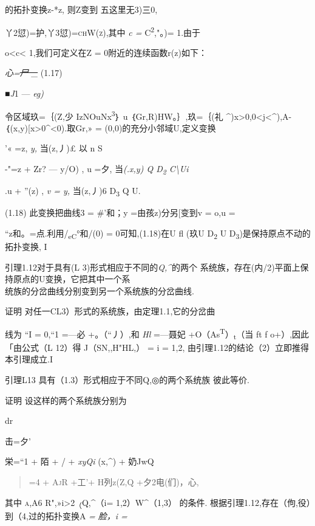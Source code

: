 \documentclass{article}
\begin{document}
的拓扑变换z-*z, 则Z变到 五这里无3)三0,

丫2愆)=护,丫3愆)\textsc{=chW(z),}其中 \emph{c =}
C\textsuperscript{2},"。)= 1.由于

o\textless{}c\textless{} 1,我们可定义在Z = 0附近的连续函数r(z)如下：

\emph{心=\sout{{尸 \_}}} (1.17)

\emph{■J}1 --- \emph{eg)}

令区域玖=｛(Z,少 IzNOuNx\textsuperscript{3}｝ u ｛Gr,R)HW。｝,玖=｛(礼
\^{})\textbar{}x\textgreater{}0,0\textless{}j\textless{}\^{}),A-
｛(x,y){[}x\textgreater{}0\^{}\textless{}0).取Gr,» =
(0,0)的充分小邻域U,定义变换

'« =z, \emph{y,} 当(z,丿)£ 以 n S

-"=z + Zr? --- y/O) , u =夕, 当\emph{(.x,y) Q D\textsubscript{2}
C\textbackslash{}Ui}

.u + ''(z) , \emph{v = y,} 当(z,丿)6 D\textsubscript{3} Q U.

(1.18) 此变换把曲线3 = \#'和；y =由孩z)分另{[}\textbar{}变到v = o,u =

``z和。=点.利用/\textsubscript{eC}°和/(0) = 0可知,(1.18)在U fl (玖U
D\textsubscript{2} U D\textsubscript{3})是保持原点不动的拓扑变换, I

引理1.12对于具有(L 3)形式相应于不同的\emph{Q,\^{}}的两个
系统族，存在(内/2)平面上保持原点的U变换，它把其中一个系\\
统族的分岔曲线分别变到另一个系统族的分岔曲线.

证明 对任一CL3）形式的系统族，由定理1.1,它的分岔曲

线为 ``I = 0,``1 =---必 +。（``丿）,和 \emph{Hl} =---聂妃
+O（As\textsuperscript{T}）\textsubscript{t}（当 ft f
o+）,因此「由公式（L 12）得 J（SN,,H"HL,） = i = 1,2,
由引理1.12的结论（2）立即推得本引理成立.I

引理L13 具有（1.3）形式相应于不同Q,◎的两个系统族 彼此等价.

证明 设这样的两个系统族分别为

dr

击=夕'

栄=``1 + 陌 + / + \emph{xyQi} (x,\^{}) + 奶JwQ

\begin{quote}
=4 + \textsc{AjR} +工'+ H列z(Z,Q +夕2电(们)，心,
\end{quote}

其中 \textsc{a,A6} R",»i\textgreater{}2\textsubscript{（}Q,\^{}（i=
1,2）W\^{}（1,3） 的条件. 根据引理1.12,存在（佝,役）到（4,过的拓扑变换A
\emph{= 脸，i =}
\end{document}
